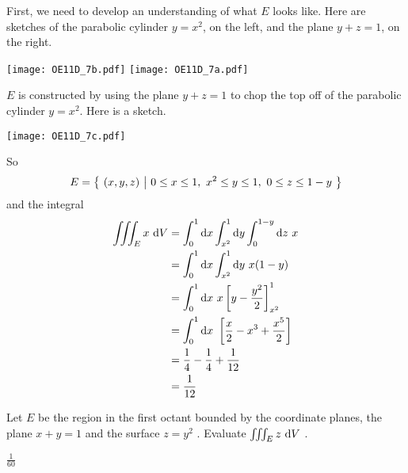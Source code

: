 \begin{solution}
First, we need to develop an understanding of what $E$ looks like.
Here are sketches of the parabolic cylinder $y=x^2$, on the left,
and the plane $y+z=1$, on the right.
\begin{center}
     \texttt{[image: OE11D\_7b.pdf]}\qquad
     \texttt{[image: OE11D\_7a.pdf]}
\end{center}
$E$ is constructed by using the plane $y+z=1$ to chop the top
off of the parabolic cylinder $y=x^2$. Here is a sketch.
\begin{center}
     \texttt{[image: OE11D\_7c.pdf]}
\end{center}
So
\begin{equation*}
E=\big\{ \ (x,y,z)\ \big|\ 0\le x\le 1,\ x^2\le y\le 1,\ 0\le z\le 1-y\ \big\}
\end{equation*}
and the integral
\begin{align*}
\iiint_E x\ \mathrm{d}V
&=\int_0^1\mathrm{d}x\int_{x^2}^1\mathrm{d}y\int_0^{1-y}\mathrm{d}z\ x \\
&=\int_0^1\mathrm{d}x\int_{x^2}^1\mathrm{d}y\ x(1-y) \\
&=\int_0^1\mathrm{d}x\ x\left[y-\frac{y^2}{2}\right]_{x^2}^1 \\
&=\int_0^1\mathrm{d}x\ \left[\frac{x}{2} -x^3+\frac{x^5}{2}\right] \\
&=\frac{1}{4}-\frac{1}{4}+\frac{1}{12} \\
&=\frac{1}{12}
\end{align*} 
\end{solution}

\begin{question}[M200 2012A] %
Let $E$ be the region in the first octant bounded by the coordinate planes, 
the plane $x + y = 1$ and the surface $z = y^2$ .  Evaluate
$\iiint_E z\ \mathrm{d}V$ .
\end{question}

%

\begin{answer}
$\frac{1}{60}$
\end{answer}


